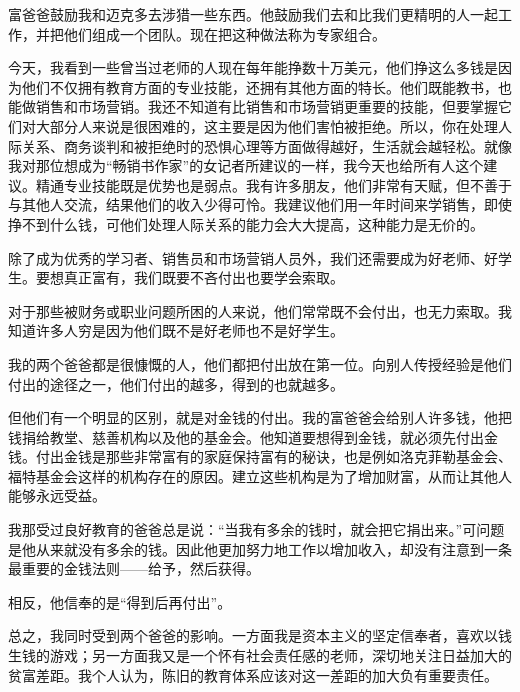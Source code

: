 富爸爸鼓励我和迈克多去涉猎一些东西。他鼓励我们去和比我们更精明的人一起工作，并把他们组成一个团队。现在把这种做法称为专家组合。

今天，我看到一些曾当过老师的人现在每年能挣数十万美元，他们挣这么多钱是因为他们不仅拥有教育方面的专业技能，还拥有其他方面的特长。他们既能教书，也能做销售和市场营销。我还不知道有比销售和市场营销更重要的技能，但要掌握它们对大部分人来说是很困难的，这主要是因为他们害怕被拒绝。所以，你在处理人际关系、商务谈判和被拒绝时的恐惧心理等方面做得越好，生活就会越轻松。就像我对那位想成为“畅销书作家”的女记者所建议的一样，我今天也给所有人这个建议。精通专业技能既是优势也是弱点。我有许多朋友，他们非常有天赋，但不善于与其他人交流，结果他们的收入少得可怜。我建议他们用一年时间来学销售，即使挣不到什么钱，可他们处理人际关系的能力会大大提高，这种能力是无价的。

除了成为优秀的学习者、销售员和市场营销人员外，我们还需要成为好老师、好学生。要想真正富有，我们既要不吝付出也要学会索取。

对于那些被财务或职业问题所困的人来说，他们常常既不会付出，也无力索取。我知道许多人穷是因为他们既不是好老师也不是好学生。

我的两个爸爸都是很慷慨的人，他们都把付出放在第一位。向别人传授经验是他们付出的途径之一，他们付出的越多，得到的也就越多。

但他们有一个明显的区别，就是对金钱的付出。我的富爸爸会给别人许多钱，他把钱捐给教堂、慈善机构以及他的基金会。他知道要想得到金钱，就必须先付出金钱。付出金钱是那些非常富有的家庭保持富有的秘诀，也是例如洛克菲勒基金会、福特基金会这样的机构存在的原因。建立这些机构是为了增加财富，从而让其他人能够永远受益。

我那受过良好教育的爸爸总是说：“当我有多余的钱时，就会把它捐出来。”可问题是他从来就没有多余的钱。因此他更加努力地工作以增加收入，却没有注意到一条最重要的金钱法则——给予，然后获得。

相反，他信奉的是“得到后再付出”。

总之，我同时受到两个爸爸的影响。一方面我是资本主义的坚定信奉者，喜欢以钱生钱的游戏；另一方面我又是一个怀有社会责任感的老师，深切地关注日益加大的贫富差距。我个人认为，陈旧的教育体系应该对这一差距的加大负有重要责任。
